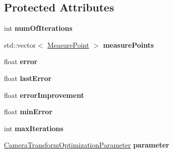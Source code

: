 \subsection*{\-Protected \-Attributes}
\begin{DoxyCompactItemize}
\item 
\hypertarget{classCameraTransformOptimization_abd78313124b14d012b208794942d2052}{int {\bfseries num\-Of\-Iterations}}\label{classCameraTransformOptimization_abd78313124b14d012b208794942d2052}

\item 
\hypertarget{classCameraTransformOptimization_a245be304c2a3c477fbedb7f467e76a92}{std\-::vector$<$ \hyperlink{classCameraMeasurePoint}{\-Measure\-Point} $>$ {\bfseries measure\-Points}}\label{classCameraTransformOptimization_a245be304c2a3c477fbedb7f467e76a92}

\item 
\hypertarget{classCameraTransformOptimization_ae07e112f39b9fa85b84055d9b859366d}{float {\bfseries error}}\label{classCameraTransformOptimization_ae07e112f39b9fa85b84055d9b859366d}

\item 
\hypertarget{classCameraTransformOptimization_aa250b60379325fa6a535e3defda4003f}{float {\bfseries last\-Error}}\label{classCameraTransformOptimization_aa250b60379325fa6a535e3defda4003f}

\item 
\hypertarget{classCameraTransformOptimization_a201614fd0ce051b2a407d8cc66efbf08}{float {\bfseries error\-Improvement}}\label{classCameraTransformOptimization_a201614fd0ce051b2a407d8cc66efbf08}

\item 
\hypertarget{classCameraTransformOptimization_a998dd4ef202d17047b05ca5b90ab5553}{float {\bfseries min\-Error}}\label{classCameraTransformOptimization_a998dd4ef202d17047b05ca5b90ab5553}

\item 
\hypertarget{classCameraTransformOptimization_a75230bc2bb1f6d7336ac6a3bf568a805}{int {\bfseries max\-Iterations}}\label{classCameraTransformOptimization_a75230bc2bb1f6d7336ac6a3bf568a805}

\item 
\hypertarget{classCameraTransformOptimization_a6f4d4dd70f728d94f6da1d18da5e309e}{\hyperlink{classCameraTransformOptimizationParameter}{\-Camera\-Transform\-Optimization\-Parameter} {\bfseries parameter}}\label{classCameraTransformOptimization_a6f4d4dd70f728d94f6da1d18da5e309e}

\end{DoxyCompactItemize}


